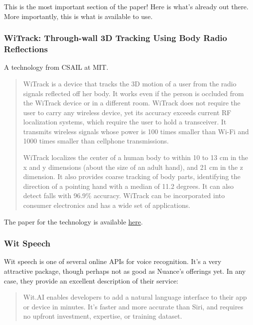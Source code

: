 \begin{multicols}{2}
		This is the most important section of the paper!
		Here is what's already out there.
		More importantly, this is what is available to use.
		
		\subsubsection{WiTrack: Through-wall 3D Tracking Using Body Radio Reflections}
		
			A technology from CSAIL at MIT.
			
			\begin{quote}
				WiTrack is a device that tracks the 3D motion of a user from the radio signals reflected off her body. It works even if the person is occluded from the WiTrack device or in a different room. WiTrack does not require the user to carry any wireless device, yet its accuracy exceeds current RF localization systems, which require the user to hold a transceiver. It transmits wireless signals whose power is 100 times smaller than Wi-Fi and 1000 times smaller than cellphone transmissions.
				
				WiTrack localizes the center of a human body to within 10 to 13 cm in the x and y dimensions (about the size of an adult hand), and 21 cm in the z dimension. It also provides coarse tracking of body parts, identifying the direction of a pointing hand with a median of 11.2 degrees. It can also detect falls with 96.9\% accuracy. WiTrack can be incorporated into consumer electronics and has a wide set of applications.
			\end{quote}
			
			The paper for the technology is available \href{http://witrack.csail.mit.edu/witrack-paper.pdf}{here}.
			
		\subsubsection{Wit Speech}
			
			Wit speech is one of several online APIs for voice recognition.
			It's a very attractive package, though perhaps not as good as Nuance's offerings yet.
			In any case, they provide an excellent description of their service:
			
			\begin{quote}
				Wit.AI enables developers to add a natural language interface to their app or device in minutes. It’s faster and more accurate than Siri, and requires no upfront investment, expertise, or training dataset.
			\end{quote}
			

\end{multicols}
